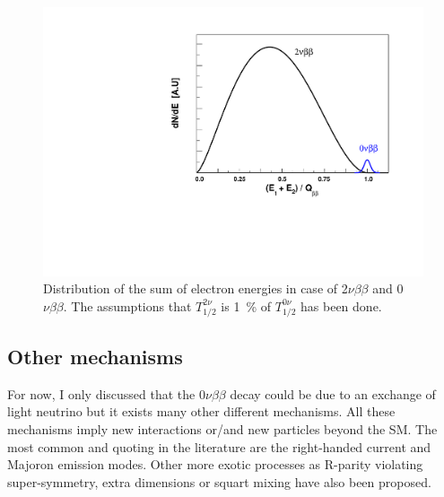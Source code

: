 \documentclass[main.tex]{subfiles}
\begin{document}
\begin{figure}[h!]
\begin{center}
\includegraphics[scale=0.55]{pictures/Chap2/BetaDecaySpectrum.pdf}
\caption{Distribution of the sum of electron energies in case of 2$\nu\beta\beta$ and 0$\nu\beta\beta$. The assumptions that $T_{\text{1/2}}^{\text{2}\nu}$ is 1~\% of $T_{\text{1/2}}^{\text{0}\nu}$ has been done.}
\label{EnergySpectrumDBD}
\end{center}
\end{figure}


\FloatBarrier

\subsection{Other mechanisms}\label{sec:OtherMechanisms}

\NI For now, I only discussed that the 0$\nu\beta\beta$ decay could be due to an exchange of light neutrino but it exists many  other different mechanisms. All these mechanisms imply new interactions or/and new particles beyond the SM. The most common and quoting in the literature are the right-handed current and Majoron emission modes. Other more exotic processes as R-parity violating super-symmetry, extra dimensions or squart mixing have also been proposed.


\end{document}

